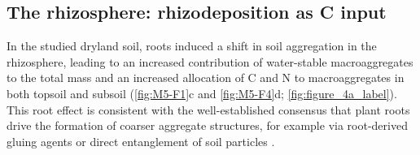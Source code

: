 \subsection{The rhizosphere: rhizodeposition as C input}

In the studied dryland soil, roots induced a shift in soil aggregation in the rhizosphere, leading to an increased contribution of water-stable macroaggregates to the total mass and an increased allocation of C and N to macroaggregates in both topsoil and subsoil (\ref{fig:M5-F1}c and \ref{fig:M5-F4}d; \ref{fig:figure_4a_label}). This root effect is consistent with the well-established consensus that plant roots drive the formation of coarser aggregate structures, for example via root-derived gluing agents or direct entanglement of soil particles \citep{Tisdall1982, Six2004, Angst2018, Gregory2022}.

